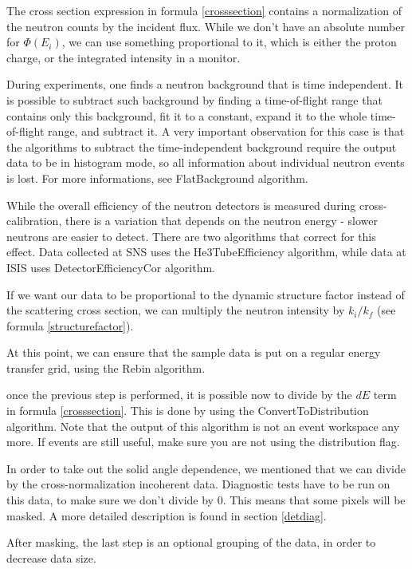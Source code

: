 The cross section expression in formula \ref{crosssection} contains a normalization of the neutron counts by the incident flux. While we don't have an absolute number for $\Phi(E_i)$, we can use something proportional to it, which is either the proton charge,  or the integrated intensity in a monitor.

During experiments, one finds a neutron background that is time independent. It is possible to subtract such background by finding a time-of-flight range that contains only this background, fit it to a constant, expand it to the whole time-of-flight range, and subtract it. A very important observation for this case is that the algorithms to subtract the time-independent background require the output data to be in histogram mode, so all information about individual neutron events is lost. For more informations, see FlatBackground algorithm.

While the overall efficiency of the neutron detectors is measured during cross-calibration, there is a variation that depends on the neutron energy - slower neutrons are easier to detect. There are two algorithms that correct for this effect. Data collected at SNS uses the He3TubeEfficiency algorithm, while data at ISIS uses  DetectorEfficiencyCor algorithm.

If we want our data to be proportional to the dynamic structure factor instead of the scattering cross section, we can multiply the neutron intensity by $k_i/k_f$ (see formula \ref{structurefactor}). 

At this point, we can ensure that the sample data is put on a regular energy transfer grid, using the Rebin algorithm.

once the previous step is performed, it is possible now to divide by the $dE$ term in formula \ref{crosssection}. This is done by using the ConvertToDistribution algorithm. Note that the output of this algorithm is not an event workspace any more. If events are still useful, make sure you are not using the distribution flag. 

In order to take out the solid angle dependence, we mentioned that we can divide by the cross-normalization incoherent data. Diagnostic tests have to be run on this data, to make sure we don't divide by 0. This means that some pixels will be masked. A more detailed description is found in section \ref{detdiag}. 

After masking, the last step is an optional grouping of the data, in order to decrease data size.

 
